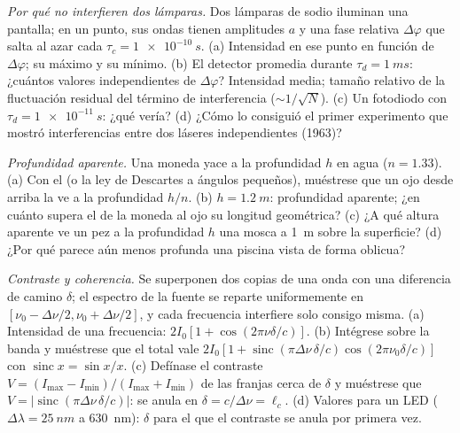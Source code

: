 \begin{exercise}[$\star\star$]\label{exo:b2:scalar-light-model:8}
\emph{Por qué no interfieren dos lámparas.} Dos lámparas de sodio iluminan una
pantalla; en un punto, sus ondas tienen amplitudes $a$ y una fase
relativa $\Delta\varphi$ que salta al azar cada $\tau_c = \qty{1e-10}{s}$. (a)
Intensidad en ese punto en función de $\Delta\varphi$; su máximo y su
mínimo. (b) El detector promedia durante $\tau_d = \qty{1}{ms}$: ¿cuántos
valores independientes de $\Delta\varphi$? Intensidad media; tamaño relativo de la
fluctuación residual del término de interferencia ($\sim 1/\sqrt N$). (c) Un
fotodiodo con $\tau_d = \qty{1e-11}{s}$: ¿qué vería? (d) ¿Cómo lo consiguió
el primer experimento que mostró interferencias entre dos láseres
independientes (1963)?
\end{exercise}

\begin{exercise}[$\star\star$]\label{exo:b2:scalar-light-model:9}
\emph{Profundidad aparente.} Una moneda yace a la profundidad $h$ en agua ($n = 1.33$).
(a) Con el  (o la ley de Descartes a ángulos pequeños), muéstrese
que un ojo desde arriba la ve a la profundidad $h/n$. (b) $h = \qty{1.2}{m}$: profundidad
aparente; ¿en cuánto supera el  de la moneda al ojo
su longitud geométrica? (c) ¿A qué altura aparente ve un pez a la profundidad $h$ una mosca a \qty{1}{m}
sobre la superficie? (d) ¿Por qué parece aún menos profunda una piscina
vista de forma oblicua?
\end{exercise}

\begin{exercise}[$\star\star\star$]\label{exo:b2:scalar-light-model:10}
\emph{Contraste y coherencia.} Se superponen dos copias de una onda con una diferencia
de camino $\delta$; el espectro de la fuente se reparte
uniformemente en $[\nu_0 - \Delta\nu/2, \nu_0 + \Delta\nu/2]$, y cada frecuencia
interfiere solo consigo misma. (a) Intensidad de una frecuencia: $2I_0
[1 + \cos(2\pi\nu\delta/c)]$. (b) Intégrese sobre la banda y muéstrese que el
total vale $2I_0[1 + \operatorname{sinc}(\pi\Delta\nu\,\delta/c)\cos(2\pi\nu_0\delta/c)]$ con
$\operatorname{sinc}x = \sin x/x$. (c) Defínase el contraste $V = (I_{\max} -
I_{\min})/(I_{\max} + I_{\min})$ de las franjas cerca de $\delta$ y muéstrese que $V =
|\operatorname{sinc}(\pi\Delta\nu\,\delta/c)|$: se anula en $\delta = c/\Delta\nu = \ell_c$. (d)
Valores para un LED ($\Delta\lambda = \qty{25}{nm}$ a \qty{630}{nm}): $\delta$ para el que el
contraste se anula por primera vez.
\end{exercise}

